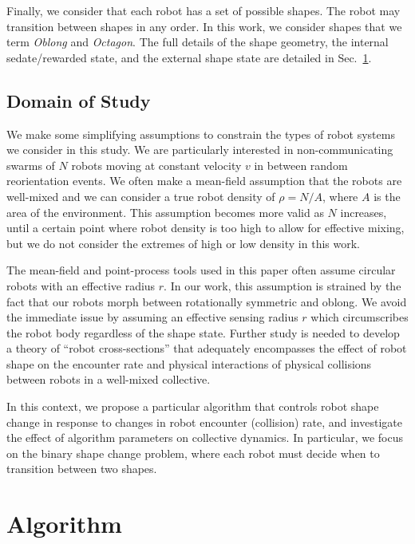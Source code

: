 \documentclass[runningheads]{llncs}
\begin{document}
Finally, we consider that each robot has a set of possible shapes. The robot may transition between shapes in any order. In this work, we consider shapes that we term \emph{Oblong} and \emph{Octagon}. The full details of the shape geometry, the internal sedate/rewarded state, and the external shape state are detailed in Sec.~\ref{sec:algorithm}.

\subsection{Domain of Study} \label{sec:domain-of-study}

We make some simplifying assumptions to constrain the types of robot systems we consider in this study. We are particularly interested in non-communicating swarms of $N$ robots moving at constant velocity $v$ in between random reorientation events. We often make a mean-field assumption that the robots are well-mixed and we can consider a true robot density of $\rho = N/A$, where $A$ is the area of the environment. This assumption becomes more valid as $N$ increases, until a certain point where robot density is too high to allow for effective mixing, but we do not consider the extremes of high or low density in this work. 

The mean-field and point-process tools used in this paper often assume circular robots with an effective radius $r$. In our work, this assumption is strained by the fact that our robots morph between rotationally symmetric and oblong. We avoid the immediate issue by assuming an effective sensing radius $r$ which circumscribes the robot body regardless of the shape state. Further study is needed to develop a theory of ``robot cross-sections'' that adequately encompasses the effect of robot shape on the encounter rate and physical interactions of physical collisions between robots in a well-mixed collective.

In this context, we propose a particular algorithm that controls robot shape change in response to changes in robot encounter (collision) rate, and investigate the effect of algorithm parameters on collective dynamics. In particular, we focus on the binary shape change problem, where each robot must decide when to transition between two shapes.

\section{Algorithm} \label{sec:algorithm}
\end{document}
